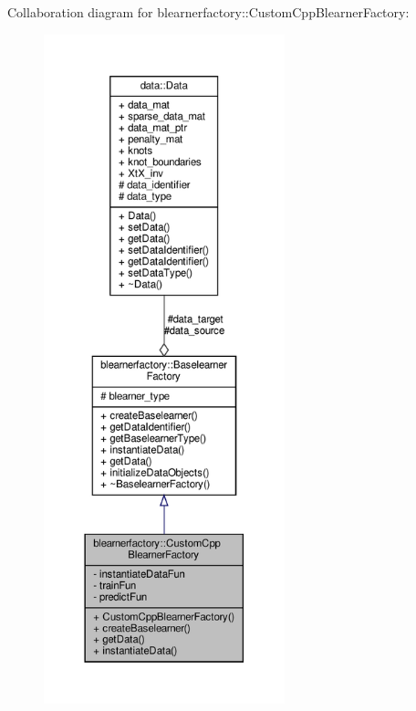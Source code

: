 Collaboration diagram for blearnerfactory\+:\+:Custom\+Cpp\+Blearner\+Factory\+:
\nopagebreak
\begin{figure}[H]
\begin{center}
\leavevmode
\includegraphics[height=550pt]{classblearnerfactory_1_1_custom_cpp_blearner_factory__coll__graph}
\end{center}
\end{figure}
